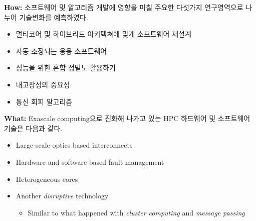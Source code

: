 \documentclass[twocolumn]{article}
\newcommand{\bi}{\begin{itemize}}
\newcommand{\ei}{\end{itemize}}
\newcommand{\ii}{\item}
\begin{document}
\noindent
\textbf{How:}  소프트웨어 및 알고리즘 개발에 영향을 미칠 주요한 다섯가지 연구영역으로 나누어 기술변화를 예측하였다.
\bi
\ii 멀티코어 및 하이브리드 아키텍쳐에 맞게 소프트웨어 재설계 
\ii 자동 조정되는 응용 소프트웨어
\ii  성능을 위한 혼합 정밀도 활용하기
\ii 내고장성의 중요성
\ii 통신 회피 알고리즘
\ei

\noindent
\textbf{What:} Exascale computing으로 진화해 나가고 있는 HPC 하드웨어 및 소프트웨어 기술은 다음과 같다.
\bi
\ii Large-scale optics based interconnects
\ii Hardware and software based fault management
\ii Heterogeneous cores
\ii Another \textit{disruptive} technology
\bi
\ii Similar to what happened with \textit{cluster computing} and \textit{message passing}
\ei
\ei




%
%
\end{document}
